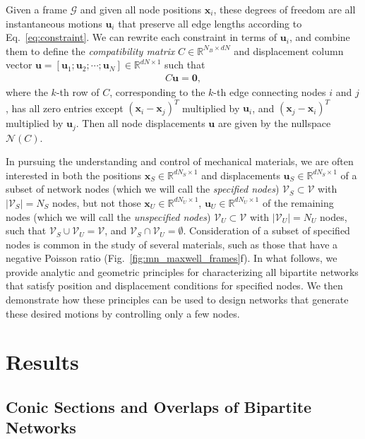 \documentclass[%
preprint,
 amsmath,amssymb,
 aps,
]{revtex4-1}
\newcommand{\mc}{\mathcal}
\newcommand{\real}{\mathbb{R}}
\begin{document}
Given a frame $\mc G$ and given all node positions $\bm{x}_i$, these degrees of freedom are all instantaneous motions $\bm{u}_i$ that preserve all edge lengths according to Eq.~\ref{eq:constraint}. We can rewrite each constraint in terms of $\bm{u}_i$, and combine them to define the \emph{compatibility matrix} $C\in\real^{N_B\times dN}$ and displacement column vector $\bm{u} = [\bm{u}_1; \bm{u}_2; \dotsm; \bm{u}_N] \in \real^{dN \times 1}$ such that
\begin{align}
\label{eq:compatibility}
C\bm{u}=\bm{0},
\end{align}
where the $k$-th row of $C$, corresponding to the $k$-th edge connecting nodes $i$ and $j$, has all zero entries except $(\bm{x}_i-\bm{x}_j)^T$ multiplied by $\bm{u}_i$, and $(\bm{x}_j-\bm{x}_i)^T$ multiplied by $\bm{u}_j$. Then all node displacements $\bm{u}$ are given by the nullspace $\mc N(C)$.

In pursuing the understanding and control of mechanical materials, we are often interested in both the positions $\bm{x}_S \in \real^{dN_S \times 1}$ and displacements $\bm{u}_S \in \real^{dN_S \times 1}$ of a subset of network nodes (which we will call the \emph{specified nodes}) $\mc V_S \subset \mc V$ with $|\mc V_S| = N_S$ nodes, but not those $\bm{x}_U \in \real^{dN_U \times 1}$,  $\bm{u}_U \in \real^{dN_U \times 1}$ of the remaining nodes (which we will call the \emph{unspecified nodes}) $\mc V_U \subset \mc V$ with $|\mc V_U| = N_U$ nodes, such that $\mc V_S \cup \mc V_U = \mc V$, and $\mc V_S \cap \mc V_U = \emptyset$. Consideration of a subset of specified nodes is common in the study of several materials, such as those that have a negative Poisson ratio (Fig.~\ref{fig:mn_maxwell_frames}f). In what follows, we provide analytic and geometric principles for characterizing all bipartite networks that satisfy position and displacement conditions for specified nodes. We then demonstrate how these principles can be used to design networks that generate these desired motions by controlling only a few nodes.



\section{Results}

\subsection{Conic Sections and Overlaps of Bipartite Networks}
\end{document}
